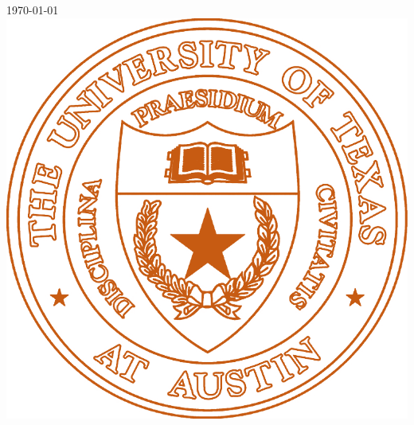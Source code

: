 \documentclass[12pt]{article}
\numberwithin{equation}{section}
\begin{document}
\begin{titlepage}


{\large \today}\\[2cm] %


\includegraphics[scale=0.14]{logo.png}\\ %
 

\vfill %

\end{titlepage}
\tableofcontents
\newpage
\end{document}
